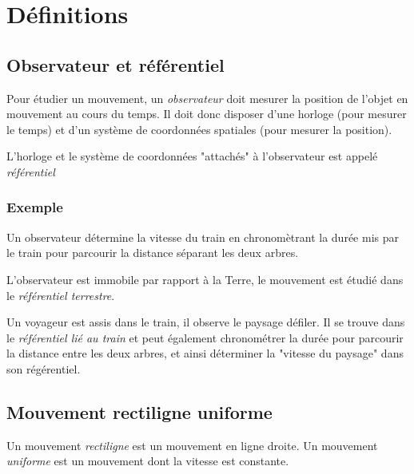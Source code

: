 

\section{Définitions}
  \subsection{Observateur et référentiel}

Pour étudier un mouvement, un {\it observateur} doit mesurer la position de l'objet en mouvement au cours du temps. Il doit donc disposer d'une horloge (pour mesurer le temps) et d'un système de coordonnées spatiales (pour mesurer la position).

L'horloge et le système de coordonnées "attachés" à l'observateur est appelé {\it référentiel}


    \subsubsection{Exemple}
Un observateur détermine la vitesse du train en chronomètrant la durée mis par le train pour parcourir la distance séparant les deux arbres.

\begin{center}

\end{center}

L'observateur est immobile par rapport à la Terre, le mouvement est étudié dans le {\it référentiel terrestre}.

Un voyageur est assis dans le train, il observe le paysage défiler. Il se trouve dans le {\it référentiel lié au train} et peut également chronométrer la durée pour parcourir la distance entre les deux arbres, et ainsi déterminer la "vitesse du paysage" dans son régérentiel.


  \subsection{Mouvement rectiligne uniforme}

Un mouvement {\it rectiligne} est un mouvement en ligne droite. Un mouvement {\it uniforme} est un mouvement dont la vitesse est constante.




